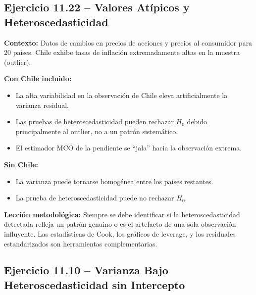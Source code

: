 \documentclass[12pt,a4paper]{report}
\theoremstyle{definition}
\theoremstyle{remark}
\begin{document}
\subsection{Ejercicio 11.22 -- Valores Atípicos y Heteroscedasticidad}

\begin{tcolorbox}[ejerciciostyle, title={Ejercicio 11.22: Chile como Valor Atípico}]
  \textbf{Contexto:} Datos de cambios en precios de acciones y precios al consumidor para 20 países. Chile exhibe tasas de inflación extremadamente altas en la muestra (outlier).

  \textbf{Con Chile incluido:}
  \begin{itemize}
    \item La alta variabilidad en la observación de Chile eleva artificialmente la varianza residual.
    \item Las pruebas de heteroscedasticidad pueden rechazar $H_0$ debido principalmente al outlier, no a un patrón sistemático.
    \item El estimador MCO de la pendiente se ``jala'' hacia la observación extrema.
  \end{itemize}

  \textbf{Sin Chile:}
  \begin{itemize}
    \item La varianza puede tornarse homogénea entre los países restantes.
    \item La prueba de heteroscedasticidad puede no rechazar $H_0$.
  \end{itemize}

  \textbf{Lección metodológica:} Siempre se debe identificar si la heteroscedasticidad detectada refleja un patrón genuino o es el artefacto de una sola observación influyente. Las estadísticas de Cook, los gráficos de leverage, y los residuales estandarizados son herramientas complementarias.
\end{tcolorbox}

\subsection{Ejercicio 11.10 -- Varianza Bajo Heteroscedasticidad sin Intercepto}
\end{document}
